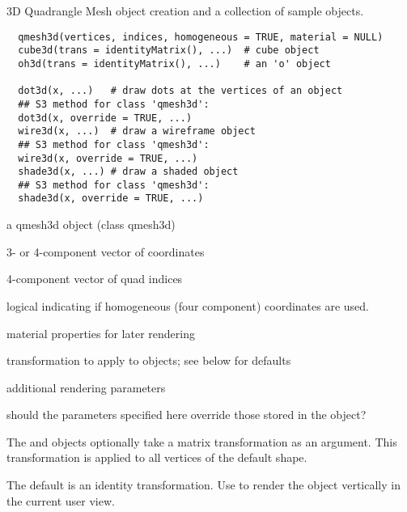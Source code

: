 \documentclass{article}
\begin{document}
\begin{Description}\relax
3D Quadrangle Mesh object creation and a collection of sample objects.
\end{Description}
\begin{Usage}
\begin{verbatim}
  qmesh3d(vertices, indices, homogeneous = TRUE, material = NULL)
  cube3d(trans = identityMatrix(), ...)  # cube object
  oh3d(trans = identityMatrix(), ...)    # an 'o' object
  
  dot3d(x, ...)   # draw dots at the vertices of an object
  ## S3 method for class 'qmesh3d':
  dot3d(x, override = TRUE, ...)
  wire3d(x, ...)  # draw a wireframe object
  ## S3 method for class 'qmesh3d':
  wire3d(x, override = TRUE, ...)
  shade3d(x, ...) # draw a shaded object
  ## S3 method for class 'qmesh3d':
  shade3d(x, override = TRUE, ...)
\end{verbatim}
\end{Usage}
\begin{Arguments}
\begin{ldescription}
\item[\code{x}] a qmesh3d object (class qmesh3d)
\item[\code{vertices}] 3- or 4-component vector of coordinates
\item[\code{indices}] 4-component vector of quad indices
\item[\code{homogeneous}] logical indicating if homogeneous (four component) coordinates are used.
\item[\code{material}] material properties for later rendering
\item[\code{trans}] transformation to apply to objects; see below for defaults
\item[\code{...}] additional rendering parameters
\item[\code{override}] should the parameters specified here override those stored in the object?
\end{ldescription}
\end{Arguments}
\begin{Details}\relax
The  and  objects optionally take a matrix transformation as 
an argument.  This transformation is applied to all vertices of the default shape.

The default is an identity transformation.  Use  to render the
object vertically in the current user view.
\end{Details}
\end{document}
